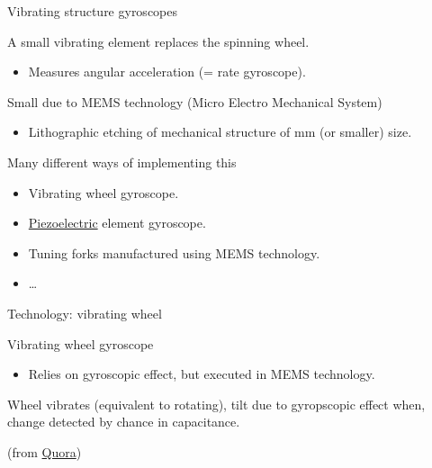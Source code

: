 \documentclass[compress]{beamer}
\begin{document}
\begin{frame}{Vibrating structure gyroscopes}

A small vibrating element replaces the spinning wheel.

\begin{itemize}

\item
  Measures angular acceleration (= rate gyroscope).
\end{itemize}

Small due to MEMS technology (Micro Electro Mechanical System)

\begin{itemize}

\item
  Lithographic etching of mechanical structure of mm (or smaller) size.
\end{itemize}

Many different ways of implementing this

\begin{itemize}

\item
  Vibrating wheel gyroscope.
\item
  \href{http://en.wikipedia.org/wiki/Piezoelectric_effect}{Piezoelectric}
  element gyroscope.
\item
  Tuning forks manufactured using MEMS technology.
\item
  \ldots{}
\end{itemize}

\end{frame}

\begin{frame}{Technology: vibrating wheel}

Vibrating wheel gyroscope

\begin{itemize}

\item
  Relies on gyroscopic effect, but executed in MEMS technology.
\end{itemize}

Wheel vibrates (equivalent to rotating), tilt due to gyropscopic effect
when, change detected by chance in capacitance.

(from
\href{https://www.quora.com/How-does-a-MEMS-gyroscope-work}{Quora})

\end{frame}
\end{document}
